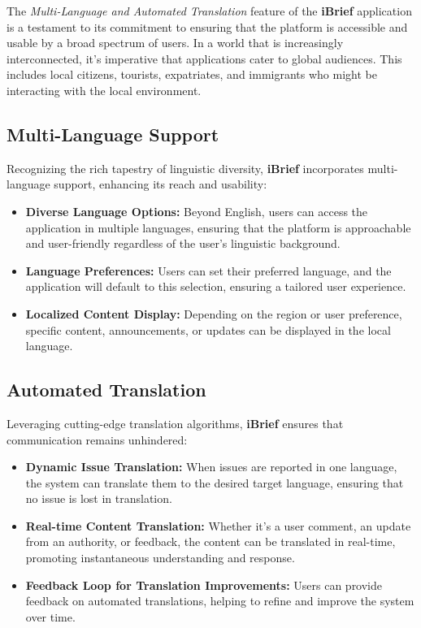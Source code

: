 The \textit{Multi-Language and Automated Translation} feature of the \textbf{iBrief} application is a testament to its commitment to ensuring that the platform is accessible and usable by a broad spectrum of users. In a world that is increasingly interconnected, it's imperative that applications cater to global audiences. This includes local citizens, tourists, expatriates, and immigrants who might be interacting with the local environment.

\subsection{Multi-Language Support}
    Recognizing the rich tapestry of linguistic diversity, \textbf{iBrief} incorporates multi-language support, enhancing its reach and usability:
        \begin{itemize}
            \item \textbf{Diverse Language Options:} Beyond English, users can access the application in multiple languages, ensuring that the platform is approachable and user-friendly regardless of the user's linguistic background.
            
            \item \textbf{Language Preferences:} Users can set their preferred language, and the application will default to this selection, ensuring a tailored user experience.
            
            \item \textbf{Localized Content Display:} Depending on the region or user preference, specific content, announcements, or updates can be displayed in the local language.
        \end{itemize}

\subsection{Automated Translation}
    Leveraging cutting-edge translation algorithms, \textbf{iBrief} ensures that communication remains unhindered:
        \begin{itemize}
            \item \textbf{Dynamic Issue Translation:} When issues are reported in one language, the system can translate them to the desired target language, ensuring that no issue is lost in translation.
            
            \item \textbf{Real-time Content Translation:} Whether it's a user comment, an update from an authority, or feedback, the content can be translated in real-time, promoting instantaneous understanding and response.
            
            \item \textbf{Feedback Loop for Translation Improvements:} Users can provide feedback on automated translations, helping to refine and improve the system over time.
        \end{itemize}

